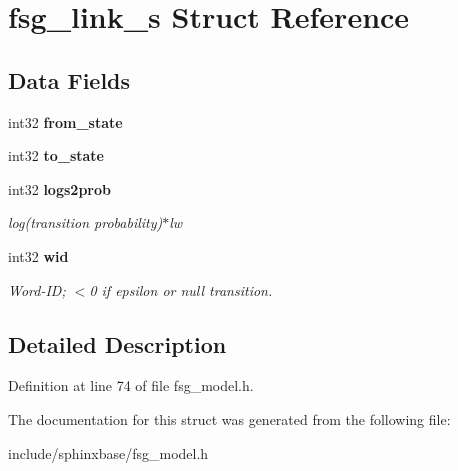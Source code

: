 \section{fsg\+\_\+link\+\_\+s Struct Reference}
\label{structfsg__link__s}
\subsection*{Data Fields}
\begin{DoxyCompactItemize}
\item 
\mbox{\label{structfsg__link__s_a850cdf896c09f6dbc3c9f466dab6c7f3}} 
int32 {\bfseries from\+\_\+state}
\item 
\mbox{\label{structfsg__link__s_a8a9270888e6aeca95db7119598797db6}} 
int32 {\bfseries to\+\_\+state}
\item 
\mbox{\label{structfsg__link__s_a4bc31131cca140338254c43eada509dc}} 
int32 \textbf{ logs2prob}
\begin{DoxyCompactList}\small\item\em log(transition probability)$\ast$lw \end{DoxyCompactList}\item 
\mbox{\label{structfsg__link__s_a99b8eb916944d981adf2c492b8193d4e}} 
int32 \textbf{ wid}
\begin{DoxyCompactList}\small\item\em Word-\/\+ID; $<$0 if epsilon or null transition. \end{DoxyCompactList}\end{DoxyCompactItemize}


\subsection{Detailed Description}


Definition at line 74 of file fsg\+\_\+model.\+h.



The documentation for this struct was generated from the following file\+:\begin{DoxyCompactItemize}
\item 
include/sphinxbase/fsg\+\_\+model.\+h\end{DoxyCompactItemize}
